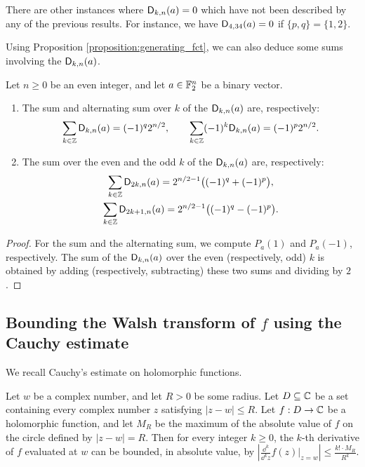 \documentclass{llncs}
\begin{document}
\begin{remark}
    There are other instances where $\Dnka nka=0$ which have not been described by any of the previous results. For instance, we have $\Dnka{34}4a=0$ if $\{p,q\}=\{1,2\}$.
\end{remark}

Using Proposition \ref{proposition:generating_fct}, we can also deduce some sums involving the $\Dnka nka$.

\begin{proposition}
    Let $n\geq 0$ be an even integer, and let $a\in\F_2^n$ be a binary vector.
    \begin{enumerate}
        \item The sum and alternating sum over $k$ of the $\Dnka nka$ are, respectively:
		\[
			\sum_{k\in\Z}\Dnka nka=(-1)^{q}2^{n/2}, \qquad
			\sum_{k\in\Z}(-1)^k\Dnka nka=(-1)^{p}2^{n/2}.
		\]
        \item The sum over the even and the odd $k$ of the $\Dnka nka$ are, respectively:
        \begin{gather*}
			\sum_{k\in\Z}\Dnka n{2k}a=2^{n/2-1}\big((-1)^{q}+(-1)^{p}\big),\\
			\sum_{k\in\Z}\Dnka n{2k+1}a=2^{n/2-1}\big((-1)^{q}-(-1)^{p}\big).
		\end{gather*}
    \end{enumerate}
\end{proposition}

\begin{proof}
	For the sum and the alternating sum, we compute $P_a(1)$ and $P_a(-1)$, respectively. The sum of the $\Dnka nka$ over the even (respectively, odd) $k$ is obtained by adding (respectively, subtracting) these two sums and dividing by $2$.
\end{proof}

\subsection{Bounding the Walsh transform of $f$ using the Cauchy estimate}\label{sec:Cauchy}

We recall Cauchy's estimate on holomorphic functions.

\begin{Prop}\label{property:cauchy_estimate}
    Let $w$ be a complex number, and let $R>0$ be some radius. Let $D\subseteq\C$ be a set containing every complex number $z$ satisfying $|z-w|\leq R$. Let $f:D\to\C$ be a holomorphic function, and let $M_R$ be the maximum of the absolute value of $f$ on the circle defined by $|z-w|=R$. Then for every integer $k\geq 0$, the $k$-th derivative of $f$ evaluated at $w$ can be bounded, in absolute value, by $\left|\frac{\dd^k}{\dd^k z}f(z)\vert_{z=w}\right|\leq\frac{k!\cdot M_R}{R^k}$.
\end{Prop}
\end{document}
